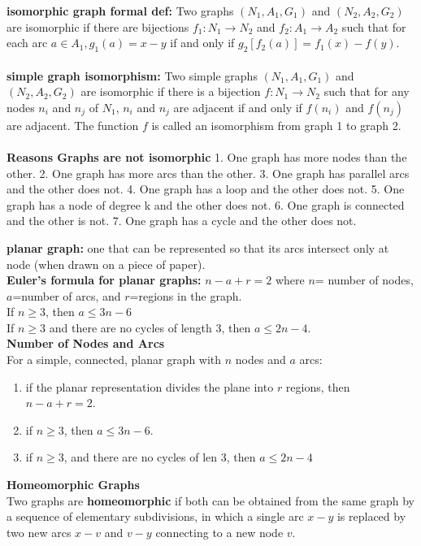 \documentclass[14pt]{extreport}
\begin{document}
\textbf{isomorphic graph formal def:} Two graphs $(N_1,A_1,G_1)$ and $(N_2,A_2,G_2)$ are isomorphic if there are bijections $f_1: N_1 \to N_2$ and $f_2: A_1 \to A_2$
such that for each arc $a \in A_1, g_1(a)=x-y$ if and only if $g_2[f_2(a)]=f_1(x)-f(y)$.\\
\\
\textbf{simple graph isomorphism:} Two simple graphs $(N_1,A_1,G_1)$ and $(N_2,A_2,G_2)$ are isomorphic if there is a bijection $f:N_1 \to N_2$ such that for any
nodes $n_i$ and $n_j$ of $N_1$, $n_i$ and $n_j$ are adjacent if and only if $f(n_i)$ and $f(n_j)$ are adjacent. The function $f$ is called an isomorphism from graph 1 to graph 2.\\
\\
\textbf{Reasons Graphs are not isomorphic}
1. One graph has more nodes than the other.
2. One graph has more arcs than the other.
3. One graph has parallel arcs and the other does not.
4. One graph has a loop and the other does not.
5. One graph has a node of degree k and the other does not.
6. One graph is connected and the other is not.
7. One graph has a cycle and the other does not.

\textbf{planar graph:} one that can be represented so that its arcs intersect only at node (when drawn on a piece of paper).\\

\textbf{Euler's formula for planar graphs:} $n-a+r=2$ where $n$= number of nodes, $a$=number of arcs, and $r$=regions in the graph.\\
If $n \ge 3$, then $a \le 3n -6$\\
If $n \ge 3$ and there are no cycles of length $3$, then $a \le 2n -4$.\\

{\bf Number of Nodes and Arcs}\\
For a simple, connected, planar graph with $n$ nodes and $a$ arcs:\\
\begin{enumerate}
    \item if the planar representation divides the plane into $r$ regions, then $n - a + r = 2$.
    \item if $n \ge 3$, then $a \le 3n -6$.
    \item if $n \ge 3$, and there are no cycles of len $3$, then $a \le 2n - 4$
\end{enumerate}

{\bf Homeomorphic Graphs}\\
Two graphs are {\bf homeomorphic} if both can be obtained from the same graph by a sequence of elementary subdivisions, in which a single arc $x-y$ is
replaced by two new arcs $x-v$ and $v-y$ connecting to a new node $v$.
\end{document}
